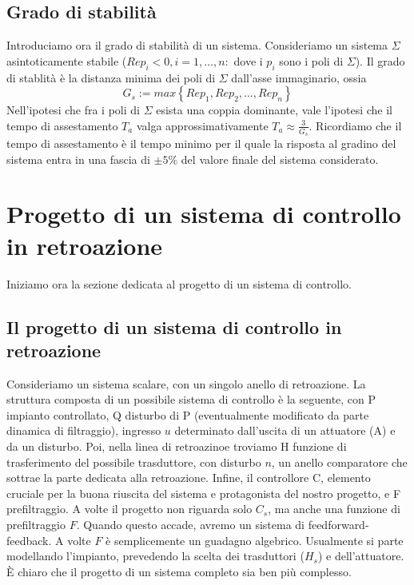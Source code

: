 \documentclass[11pt]{article}
\begin{document}
\subsection{Grado di stabilità}
Introduciamo ora il grado di stabilità di un sistema. Consideriamo un sistema $\Sigma$ asintoticamente stabile ($Re p_i <0, i=1,\dots,n:$ dove i $p_i$ sono i poli di $\Sigma$). Il grado di stablità è la distanza minima dei poli di $\Sigma$ dall'asse immaginario, ossia
\begin{displaymath}
    G_s := max\left\{Rep_1, Re p_2, ..., Re p_n\right\}
\end{displaymath}
Nell'ipotesi che fra i poli di $\Sigma$ esista una coppia dominante, vale l'ipotesi che il tempo di assestamento $T_a$ valga approssimativamente $T_a \approx \frac{3}{G_s}$. Ricordiamo che il tempo di assestamento è il tempo minimo per il quale la risposta al gradino del sistema entra in una fascia di $\pm 5\%$ del valore finale del sistema considerato. 
\section{Progetto di un sistema di controllo in retroazione}
Iniziamo ora la sezione dedicata al progetto di un sistema di controllo.
\subsection{Il progetto di un sistema di controllo in retroazione}
Consideriamo un sistema scalare, con un singolo anello di retroazione. La struttura composta di un possibile sistema di controllo è la seguente, con P impianto controllato, Q disturbo di P (eventualmente modificato da parte dinamica di filtraggio), ingresso $u$ determinato dall'uscita di un attuatore (A) e da un disturbo. Poi, nella linea di retroazinoe troviamo H funzione di trasferimento del possibile trasduttore, con disturbo $n$, un anello comparatore che sottrae la parte dedicata alla retroazione. Infine, il controllore C, elemento cruciale per la buona riuscita del sistema e protagonista del nostro progetto, e F prefiltraggio. A volte il progetto non riguarda solo $C_s$, ma anche una funzione di prefiltraggio $F$. Quando questo accade, avremo un sistema di feedforward-feedback. A volte $F$ è semplicemente un guadagno algebrico. Usualmente si parte modellando l'impianto, prevedendo la scelta dei trasduttori ($H_s$) e dell'attuatore. 
È chiaro che il progetto di un sistema completo sia ben più complesso. 
\end{document}
